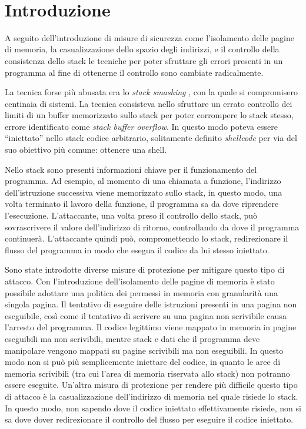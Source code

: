 \thispagestyle{empty}
\
\newpage
\clearpage{\pagestyle{empty}\cleardoublepage}
\mainmatter
\chapter{Introduzione}


A seguito dell'introduzione di misure di sicurezza come l'isolamento
delle pagine di memoria, la casualizzazione dello spazio degli
indirizzi, e il controllo della consistenza dello stack le tecniche
per poter sfruttare gli errori presenti in un programma al fine di
ottenerne il controllo sono cambiate radicalmente.

La tecnica forse più abusata era lo \emph{stack smashing}
\cite{Phrack-96}, con la quale si compromisero centinaia di
sistemi. La tecnica consisteva nello sfruttare un errato controllo dei
limiti di un buffer memorizzato sullo stack per poter corrompere lo
stack stesso, errore identificato come \emph{stack buffer
  overflow}. In questo modo poteva essere ``iniettato'' nello stack
codice arbitrario, solitamente definito \emph{shellcode} per via del
suo obiettivo più comune: ottenere una shell. 

Nello stack sono presenti informazioni chiave per il funzionamento del
programma. Ad esempio, al momento di una chiamata a funzione,
l'indirizzo dell'istruzione successiva viene memorizzato sullo stack,
in questo modo, una volta terminato il lavoro della funzione, il
programma sa da dove riprendere l'esecuzione. L'attaccante, una volta
preso il controllo dello stack, può sovrascrivere il valore
dell'indirizzo di ritorno, controllando da dove il programma
continuerà. L'attaccante quindi può, compromettendo lo stack,
redirezionare il flusso del programma in modo che esegua il codice da
lui stesso iniettato.

Sono state introdotte diverse misure di protezione per mitigare questo
tipo di attacco. Con l'introduzione dell'isolamento delle pagine di
memoria è stato possibile adottare una politica dei permessi in
memoria con granularità una singola pagina. Il tentativo di eseguire
delle istruzioni presenti in una pagina non eseguibile, così come il
tentativo di scrivere su una pagina non scrivibile causa l'arresto del
programma. Il codice legittimo viene mappato in memoria in pagine
eseguibili ma non scrivibili, mentre stack e dati che il programma
deve manipolare vengono mappati su pagine scrivibili ma non
eseguibili. In questo modo non si può più semplicemente iniettare del
codice, in quanto le aree di memoria scrivibili (tra cui l'area di
memoria riservata allo stack) non potranno essere eseguite. Un'altra
misura di protezione per rendere più difficile questo tipo di attacco
è la casualizzazione dell'indirizzo di memoria nel quale risiede lo
stack. In questo modo, non sapendo dove il codice iniettato
effettivamente risiede, non si sa dove dover redirezionare il
controllo del flusso per eseguire il codice iniettato.

